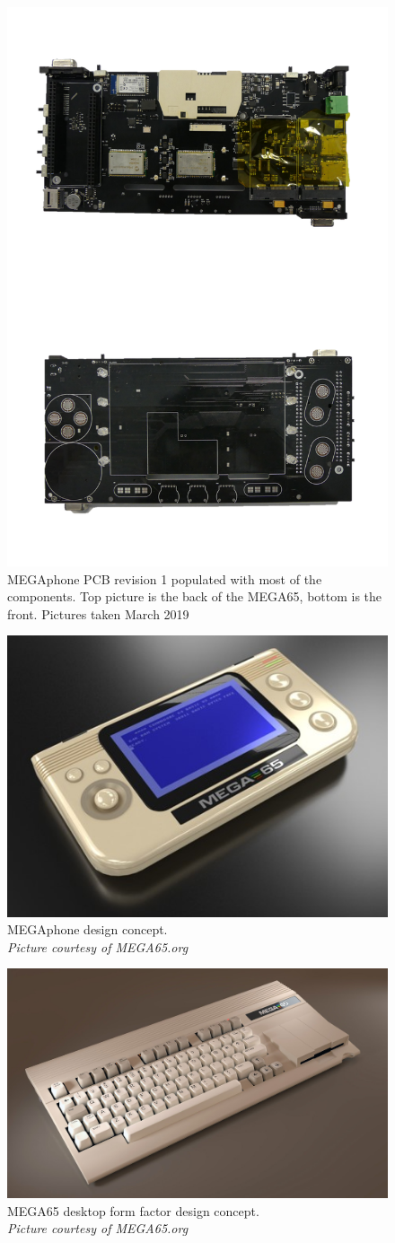 \begin{figure} \begin{center}
\includegraphics[width=0.5\linewidth]{pics/MEGAphone} 
\end{center} 
\caption{MEGAphone PCB revision 1 populated with most of the components. Top picture is the back of the MEGA65, bottom is the front. Pictures taken March 2019}
\label{MEGAphone PCB}
\end{figure}

\begin{figure} \begin{center}
\includegraphics[width=0.5\linewidth]{pics/MEGAphone_concept} 
\end{center} 
\caption{MEGAphone design concept. \\
\textit{\small{Picture courtesy of MEGA65.org}}}
\label{MEGAphone concept}
\end{figure}

\begin{figure} \begin{center}
\includegraphics[width=0.5\linewidth]{pics/MEGA65_desktop} 
\end{center} 
\caption{MEGA65 desktop form factor design concept. \\
\textit{\small{Picture courtesy of MEGA65.org}}}
\label{MEGA65 desktop}
\end{figure}



